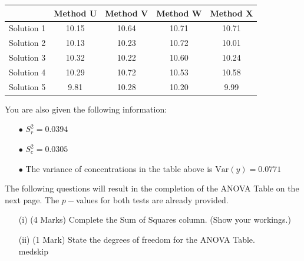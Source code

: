 \documentclass[a4paper,12pt]{article}
\begin{document}
\begin{itemize}
\begin{table}[ht]
	\centering
	\begin{tabular}{|r||c|c|c|c|}
		\hline
		& Method U & Method V & Method W & Method X \\ 
		\hline
	Solution 1 & 10.15 & 10.64 & 10.71 & 10.71 \\ 
	Solution 2 & 10.13 & 10.23 & 10.72 & 10.01 \\ 
	Solution 3 & 10.32 & 10.22 & 10.60 & 10.24 \\ 
	Solution 4 & 10.29 & 10.72 & 10.53 & 10.58 \\ 
	Solution 5 & 9.81 & 10.28 & 10.20 & 9.99 \\ 
		\hline
	\end{tabular}
\end{table}


%	
%	
%	
%	
%	
%	
%	
%	
%	
%	
	
	\noindent You are also given the following information:
	\begin{itemize}
		\item[$\bullet$] $S^2_r = 0.0394$
		\item[$\bullet$] $S^2_c = 0.0305$
		\item[$\bullet$] The variance of concentrations in the table above is $\mbox{Var}(y) = 0.0771$
	\end{itemize}
	\bigskip 
	\noindent The following questions will result in the completion of the ANOVA Table on the next page. The $p-$values for both tests are already provided.
	\begin{itemize}
		\item[(i)](4 Marks) Complete the Sum of Squares column. (Show your workings.)
		\item[(ii)] (1 Mark) State the degrees of freedom for the ANOVA Table.\\ medskip
		

\end{itemize}
\end{itemize}
\end{document}

